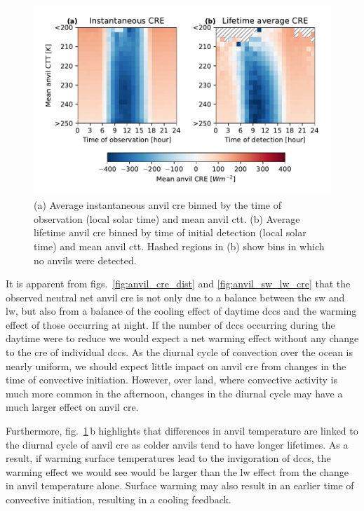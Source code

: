 \documentclass[acp, manuscript]{copernicus}
\begin{document}
\begin{figure}[tp]
    \includegraphics[width=12cm]{figures/fig13.pdf}
    \caption[
    Average anvil \acrshort{cre} binned by the time of detection (local time) and mean anvil \acrshort{ctt}
    ]{
    (a) Average instantaneous anvil \acrshort{cre} binned by the time of observation (local solar time) and mean anvil \acrshort{ctt}. (b) Average lifetime anvil \acrshort{cre} binned by time of initial detection (local solar time) and mean anvil \acrshort{ctt}. Hashed regions in (b) show bins in which no anvils were detected.
    }
    \label{fig:anvil_cre_time_vs_ctt}
\end{figure}


It is apparent from figs.~\ref{fig:anvil_cre_dist} and \ref{fig:anvil_sw_lw_cre} that the observed neutral net anvil \acrshort{cre} is not only due to a balance between the \acrshort{sw} and \acrshort{lw}, but also from a balance of the cooling effect of daytime \acrshort{dcc}s and the warming effect of those occurring at night. 
If the number of \acrshort{dcc}s occurring during the daytime were to reduce we would expect a net warming effect without any change to the \acrshort{cre} of individual \acrshort{dcc}s.
As the diurnal cycle of convection over the ocean is nearly uniform, we should expect little impact on anvil \acrshort{cre} from changes in the time of convective initiation.
However, over land, where convective activity is much more common in the afternoon, changes in the diurnal cycle may have a much larger effect on anvil \acrshort{cre}.

Furthermore, fig.~\ref{fig:anvil_cre_time_vs_ctt}\,b highlights that differences in anvil temperature are linked to the diurnal cycle of anvil \acrshort{cre} as colder anvils tend to have longer lifetimes.
As a result, if warming surface temperatures lead to the invigoration of \acrshort{dcc}s, the warming effect we would see would be larger than the \acrshort{lw} effect from the change in anvil temperature alone. 
Surface warming may also result in an earlier time of convective initiation, resulting in a cooling feedback.
\end{document}
